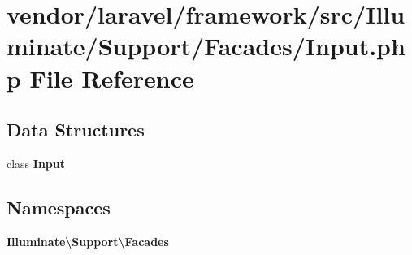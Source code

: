 \section{vendor/laravel/framework/src/\+Illuminate/\+Support/\+Facades/\+Input.php File Reference}
\label{laravel_2framework_2src_2_illuminate_2_support_2_facades_2_input_8php}
\subsection*{Data Structures}
\begin{DoxyCompactItemize}
\item 
class {\bf Input}
\end{DoxyCompactItemize}
\subsection*{Namespaces}
\begin{DoxyCompactItemize}
\item 
 {\bf Illuminate\textbackslash{}\+Support\textbackslash{}\+Facades}
\end{DoxyCompactItemize}
